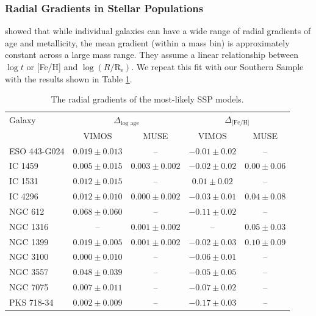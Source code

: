 		\subsubsection{Radial Gradients in Stellar Populations}
			\label{subsubsec:popGrad}

			\citet{Koleva2011} showed that while individual galaxies can have a wide range of radial gradients of age and metallicity, the mean gradient (within a mass bin) is approximately constant across a large mass range. They assume a linear relationship between $\log t$ or [Fe/H] and $\log (R/\mathrm{R_e})$. We repeat this fit with our Southern Sample with the results shown in Table \ref{tab:popGrad}. 

			\begin{table}
				\centering
				\caption{The radial gradients of the most-likely SSP models.}
				\label{tab:popGrad}
				\begin{tabular}{l c c c c}
					\hline
					\hline 
					Galaxy 	& \multicolumn{2}{c}{$\Delta_\text{log age}$} & \multicolumn{2}{c}{$\Delta_\text{[Fe/H]}$} \\
						& VIMOS & MUSE & VIMOS & MUSE \\
					\hline
					ESO 443-G024 & $0.019 \pm 0.013$ & -- & $-0.01 \pm 0.02$ & -- \\
					IC 1459 	& $0.005 \pm 0.015$ & $0.003 \pm 0.002$ & $-0.02 \pm 0.02$ & $0.00 \pm 0.06$ \\
					IC 1531 	& $0.012 \pm 0.015$ & -- & $0.01 \pm 0.02$ & -- \\
					IC 4296		& $0.012 \pm 0.010$ & $0.000 \pm 0.002$ & $-0.03 \pm 0.01$ & $0.04 \pm 0.08$ \\
					NGC 612 	& $0.068 \pm 0.060$ & -- & $-0.11 \pm 0.02$ & -- \\
					NGC 1316 	& -- & $0.001 \pm 0.002$ & -- &$0.05 \pm 0.03$ \\
					NGC 1399 	& $0.019 \pm 0.005$ & $0.001 \pm 0.002$ & $-0.02 \pm 0.03$ & $0.10 \pm 0.09$ \\
					NGC 3100 	& $0.000 \pm 0.010$ & -- & $-0.06 \pm 0.01$ & -- \\
					NGC 3557 	& $0.048 \pm 0.039$ & -- & $-0.05 \pm 0.05$ & -- \\
					NGC 7075 	& $0.007 \pm 0.011$ & -- & $-0.07 \pm 0.02$ & -- \\
					PKS 718-34  & $0.002 \pm 0.009$ & -- & $-0.17 \pm 0.03$ & -- \\
					\hline
					\hline
				\end{tabular}
			\end{table}

